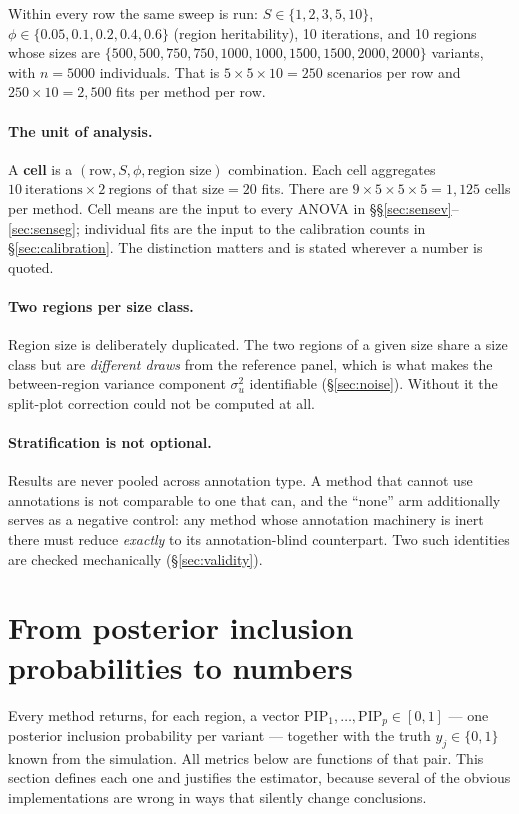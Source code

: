 \documentclass[11pt,a4paper]{article}
\newcommand{\pip}{\mathrm{PIP}}
\begin{document}
Within every row the same sweep is run: $S\in\{1,2,3,5,10\}$,
$\phi\in\{0.05,0.1,0.2,0.4,0.6\}$ (region heritability), 10 iterations, and 10
regions whose sizes are $\{500,500,750,750,1000,1000,1500,1500,2000,2000\}$
variants, with $n=5000$ individuals. That is $5\times5\times10=250$ scenarios
per row and $250\times10=2{,}500$ fits per method per row.

\paragraph{The unit of analysis.} A \textbf{cell} is a
$(\text{row},S,\phi,\text{region size})$ combination. Each cell aggregates
$10\ \text{iterations}\times 2\ \text{regions of that size}=20$ fits. There are
$9\times5\times5\times5=1{,}125$ cells per method. Cell means are the input to
every ANOVA in \S\S\ref{sec:sensev}--\ref{sec:senseg}; individual fits are the
input to the calibration counts in \S\ref{sec:calibration}. The distinction
matters and is stated wherever a number is quoted.

\paragraph{Two regions per size class.} Region size is deliberately duplicated.
The two regions of a given size share a size class but are \emph{different
draws} from the reference panel, which is what makes the between-region
variance component $\sigma_u^2$ identifiable (\S\ref{sec:noise}). Without it
the split-plot correction could not be computed at all.

\paragraph{Stratification is not optional.} Results are never pooled across
annotation type. A method that cannot use annotations is not comparable to one
that can, and the ``none'' arm additionally serves as a negative control: any
method whose annotation machinery is inert there must reduce \emph{exactly} to
its annotation-blind counterpart. Two such identities are checked mechanically
(\S\ref{sec:validity}).

\section{From posterior inclusion probabilities to numbers}\label{sec:methods}

Every method returns, for each region, a vector
$\pip_1,\dots,\pip_p\in[0,1]$ --- one posterior inclusion probability per
variant --- together with the truth $y_j\in\{0,1\}$ known from the simulation.
All metrics below are functions of that pair. This section defines each one and
justifies the estimator, because several of the obvious implementations are
wrong in ways that silently change conclusions.
\end{document}

